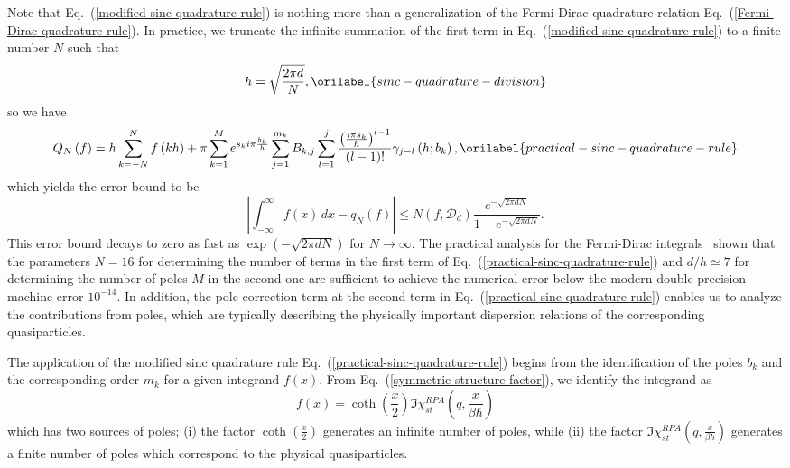 \documentclass[aps,showkeys,noshowpacs,superscriptaddress,pre,preprint]{revtex4-2}
\let\label\orilabel
\begin{document}
Note that Eq.~(\ref{modified-sinc-quadrature-rule}) is nothing more than 
a generalization of the Fermi-Dirac quadrature relation Eq.~(\ref{Fermi-Dirac-quadrature-rule}).
In practice, 
we truncate the infinite summation of the first term in Eq.~(\ref{modified-sinc-quadrature-rule}) 
to a finite number $N$ such that
\begin{equation}
h = \sqrt{\frac{2\pi d}{N}} ,
\label{sinc-quadrature-division}
\end{equation}
so we have
\begin{equation}
{Q_N \left( f \right)} = h \sum_{k = - N}^{N} {f \left( k h \right)}
+ \pi \sum_{k = 1}^{M} e^{s_k i \pi \frac{b_k}{h}}
\sum_{j = 1}^{m_k} B_{k,j} \sum_{l = 1}^{j}
\frac{ \left( \frac{i \pi {s_k}}{h} \right)^{l-1}}{\left( l - 1 \right) !} \gamma_{j-l} \left( h; b_k \right) ,
\label{practical-sinc-quadrature-rule}
\end{equation}
which yields the error bound to be
\begin{equation*}
\left\vert \int_{-\infty}^{\infty} {f(x)} \, dx - {q_N (f)} \right\vert
\le N \left( f, \mathcal{D}_d \right)
\frac{e^{- \sqrt{2\pi d N}}}{1 - e^{- \sqrt{2\pi d N}}} .
\end{equation*}
This error bound decays to zero as fast as $\exp\left( {- \sqrt{2\pi d N}} \right)$ for $N \rightarrow \infty$.
The practical analysis for the Fermi-Dirac integrals~\cite{Mohankumar-Natarajan1995} shown that
the parameters $N=16$ for determining the number of terms in 
the first term of Eq.~(\ref{practical-sinc-quadrature-rule})
and $d/h \simeq 7$ for determining the number of poles $M$ in the second one
are sufficient to achieve the numerical error below the modern double-precision machine error $10^{-14}$.
In addition, the pole correction term at the second term in Eq.~(\ref{practical-sinc-quadrature-rule})
enables us to analyze the contributions from poles,
which are typically describing the physically important dispersion relations of 
the corresponding quasiparticles.

The application of the modified sinc quadrature rule Eq.~(\ref{practical-sinc-quadrature-rule})
begins from the identification of the poles $b_k$ and the corresponding order $m_k$
for a given integrand ${f (x)}$.
From Eq.~(\ref{symmetric-structure-factor}), we identify the integrand as
\begin{equation*}
{f (x)} = {\coth \left( \frac{x}{2} \right)}  
{\Im \chi^{RPA}_{st} \left( q, \frac{x}{\beta\hbar} \right) }
\end{equation*}
which has two sources of poles;
(i) the factor ${\coth \left( \frac{x}{2} \right)}$ generates an infinite number of poles,
while (ii) the factor ${\Im \chi^{RPA}_{st} \left( q, \frac{x}{\beta\hbar} \right) }$ generates
a finite number of poles which correspond to the physical quasiparticles.
\end{document}
